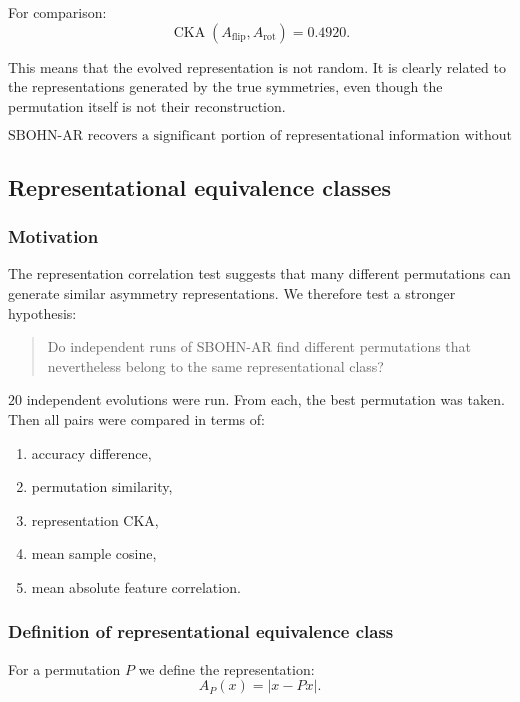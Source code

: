 \documentclass[11pt,a4paper]{report}
\begin{document}
For comparison:
\[
\operatorname{CKA}(A_{\mathrm{flip}},A_{\mathrm{rot}})=0.4920.
\]

This means that the evolved representation is not random. It is clearly related to the representations generated by the true symmetries, even though the permutation itself is not their reconstruction.

\[
\boxed{\text{SBOHN-AR recovers a significant portion of representational information without recovering the generator.}}
\]

\subsection{Representational equivalence classes}

\subsubsection{Motivation}

The representation correlation test suggests that many different permutations can generate similar asymmetry representations. We therefore test a stronger hypothesis:

\begin{quote}
Do independent runs of SBOHN-AR find different permutations that nevertheless belong to the same representational class?
\end{quote}

$20$ independent evolutions were run. From each, the best permutation was taken. Then all pairs were compared in terms of:
\begin{enumerate}
\item accuracy difference,
\item permutation similarity,
\item representation CKA,
\item mean sample cosine,
\item mean absolute feature correlation.
\end{enumerate}

\subsubsection{Definition of representational equivalence class}

For a permutation $P$ we define the representation:
\[
A_P(x)=|x-Px|.
\]
\end{document}
